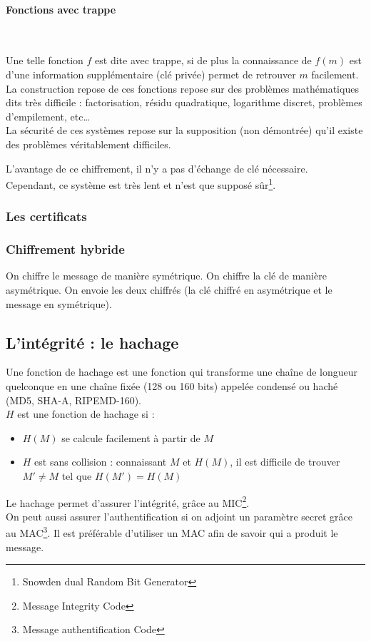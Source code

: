 \paragraph{Fonctions avec trappe}~\\\par
Une telle fonction $f$ est dite avec trappe, si de plus la connaissance de $f(m)$ est d'une information supplémentaire (clé privée) permet de retrouver $m$ facilement.\\
La construction repose de ces fonctions repose sur des problèmes mathématiques dits très difficile : factorisation, résidu quadratique, logarithme discret, problèmes d’empilement, etc\ldots\\
La sécurité de ces systèmes repose sur la supposition (non démontrée) qu'il existe des problèmes véritablement difficiles.\\\par
L'avantage de ce chiffrement, il n'y a pas d'échange de clé nécessaire.\\
Cependant, ce système est très lent et n'est que supposé sûr\footnote{Snowden dual Random Bit Generator}.
\subsubsection{Les certificats}

\subsubsection{Chiffrement hybride}
On chiffre le message de manière symétrique. On chiffre la clé de manière asymétrique. On envoie les deux chiffrés (la clé chiffré en asymétrique et le message en symétrique).
\subsection{L'intégrité : le hachage}
Une fonction de hachage est une fonction qui transforme une chaîne de longueur quelconque en une chaîne fixée (128 ou 160 bits) appelée condensé ou haché (MD5, SHA-A, RIPEMD-160).\\
$H$ est une fonction de hachage si : 
\begin{itemize}
 \item $H(M)$ se calcule facilement à partir de $M$
 \item $H$ est sans collision : connaissant $M$ et $H(M)$, il est difficile de trouver $M'\neq M$ tel que $H(M')=H(M)$
\end{itemize}
Le hachage permet d'assurer l'intégrité, grâce au MIC\footnote{Message Integrity Code}.\\
On peut aussi assurer l'authentification si on adjoint un paramètre secret grâce au MAC\footnote{Message authentification Code}. Il est préférable d'utiliser un MAC afin de savoir qui a produit le message.
